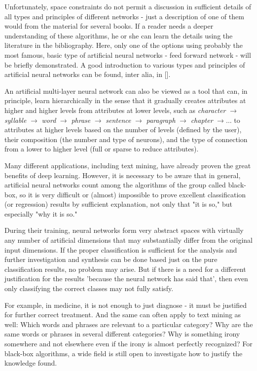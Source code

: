 Unfortunately, space constraints do not permit a discussion in sufficient details of all types and principles of different networks - just a description of one of them would from the material for several books. If a reader needs a deeper understanding of these algorithms, he or she can learn the details using the literature in the bibliography. Here, only one of the options using probably the most famous, basic type of artificial neural networks - feed forward network - will be briefly demonstrated. A good introduction to various types and principles of artificial neural networks can be found, inter alia, in [\cite{ref113}].

An artificial multi-layer neural network can also be viewed as a tool that can, in principle, learn hierarchically in the sense that it gradually creates attributes at higher and higher levels from attributes at lower levels, such as \textit{character} $\rightarrow$ \textit{syllable} $\rightarrow$ \textit{word} $\rightarrow$ \textit{phrase} $\rightarrow$ \textit{sentence} $\rightarrow$ \textit{paragraph} $\rightarrow$ \textit{chapter} $\rightarrow \ldots$ to attributes at higher levels based on the number of levels (defined by the user), their composition (the number and type of neurons), and the type of connection from a lower to higher level (full or sparse to reduce attributes).

Many different applications, including text mining, have already proven the great benefits of deep learning. However, it is necessary to be aware that in general, artificial neural networks count among the algorithms of the group called black-box, so it is very difficult or (almost) impossible to prove excellent classification (or regression) results by sufficient explanation, not only that "it is so," but especially "why it is so."

During their training, neural networks form very abstract spaces with virtually any number of artificial dimensions that may substantially differ from the original input dimensions. If the proper classification is sufficient for the analysis and further investigation and synthesis can be done based just on the pure classification results, no problem may arise. But if there is a need for a different justification for the results 'because the neural network has said that', then even only classifying the correct classes may not fully satisfy.

For example, in medicine, it is not enough to just diagnose - it must be justified for further correct treatment. And the same can often apply to text mining as well: Which words and phrases are relevant to a particular category? Why are the same words or phrases in several different categories? Why is something irony somewhere and not elsewhere even if the irony is almost perfectly recognized? For black-box algorithms, a wide field is still open to investigate how to justify the knowledge found.
